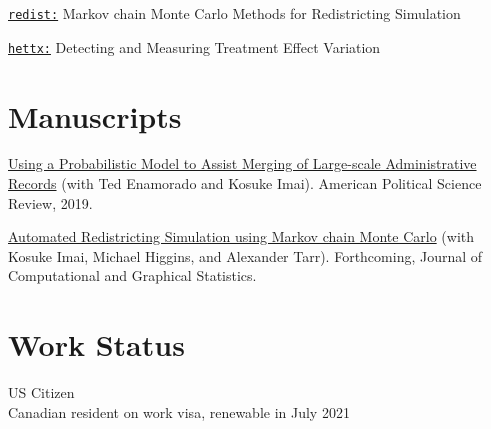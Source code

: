 \documentclass[]{deedy-resume-openfont}
\begin{document}
\begin{minipage}[t]{0.33\textwidth}
\href{https://github.com/kosukeimai/redist}{\texttt{redist:}} Markov chain Monte Carlo Methods for Redistricting Simulation\vspace{1mm}

\href{https://github.com/bfifield/hettx}{\texttt{hettx:}} Detecting and Measuring Treatment Effect Variation
\sectionsep

\section{Manuscripts}
\href{https://imai.fas.harvard.edu/research/linkage.html}{Using a Probabilistic Model to Assist Merging of Large-scale Administrative Records} (with Ted Enamorado and Kosuke Imai). American Political Science Review, 2019.\\\vspace{2mm}

\href{https://imai.fas.harvard.edu/research/files/redist.pdf}{Automated Redistricting Simulation using Markov chain Monte Carlo} (with Kosuke Imai, Michael Higgins, and Alexander Tarr). Forthcoming, Journal of Computational and Graphical Statistics.\\\vspace{2mm}


\section{Work Status}
US Citizen\\
Canadian resident on work visa, renewable in July 2021

%
%

\end{minipage} 
\hfill
\end{document}
